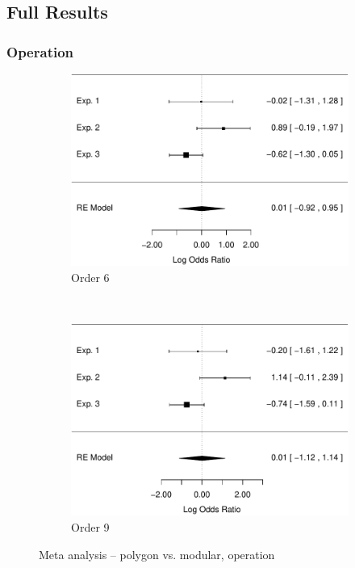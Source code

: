 \documentclass[man,10pt]{apa6}
\begin{document}
\subsection{Full Results}
\subsubsection{Operation}
\begin{figure}[t]
\centering
\begin{subfigure}[c]{0.4\textwidth}
\centering
\includegraphics[width=\textwidth]{figures/meta/conditionpolygon.pdf}
\caption{Order 6}
\end{subfigure}
~
\begin{subfigure}[c]{0.4\textwidth}
\centering
\includegraphics[width=\textwidth]{figures/meta/question_typeoperation_9_conditionpolygon.pdf}
\caption{Order 9}
\end{subfigure}
\caption{Meta analysis -- polygon vs. modular, operation}
\label{meta_op_p}
\end{figure}\noindent 
\end{document}
